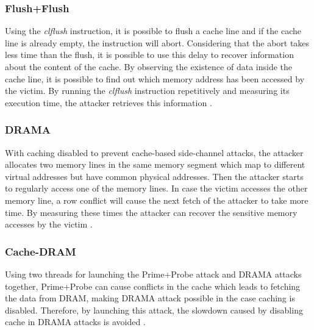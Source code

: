 \subsubsection{Flush+Flush}
Using the \emph{clflush} instruction, it is possible to flush a cache line and if the cache line is already empty, the instruction will abort. Considering that the abort takes less time than the flush, it is possible to use this delay to recover information about the content of the cache. By observing the existence of data inside the cache line, it is possible to find out which memory address has been accessed by the victim. By running the \emph{clflush} instruction repetitively and measuring its execution time, the attacker retrieves this information \cite{flushflush}.


\subsubsection{DRAMA}
With caching disabled to prevent cache-based side-channel attacks, the attacker allocates two memory lines in the same memory segment which map to different virtual addresses but have common physical addresses. Then the attacker starts to regularly access one of the memory lines. In case the victim accesses the other memory line, a row conflict will cause the next fetch of the attacker to take more time. By measuring these times the attacker can recover the sensitive memory accesses by the victim \cite{leakycauldron,drama}.

\subsubsection{Cache-DRAM}
Using two threads for launching the Prime+Probe attack \cite{primeprobe1, primeprobe2} and DRAMA attacks \cite{drama} together, Prime+Probe can cause conflicts in the cache which leads to fetching the data from DRAM, making DRAMA attack possible in the case caching is disabled. Therefore, by launching this attack, the slowdown caused by disabling cache in DRAMA attacks is avoided \cite{leakycauldron}.


